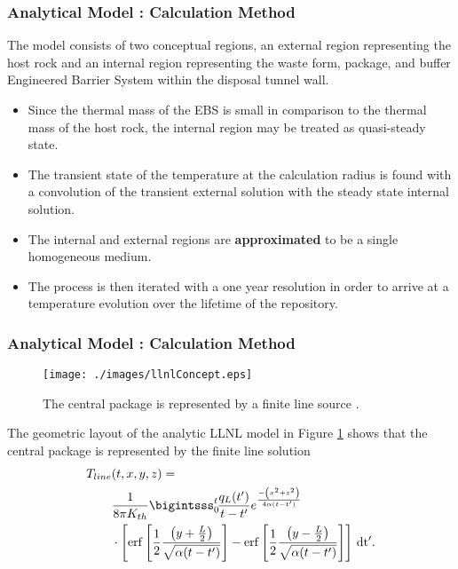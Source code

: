 \begin{frame}[ctb!]
\frametitle{Analytical Model : Calculation Method}
The model consists of two conceptual regions, an external region representing 
the host rock and an internal region representing the waste form, package, and 
buffer Engineered Barrier System within the disposal tunnel wall.   
\begin{itemize}
  \item Since the thermal mass of the EBS is small in comparison to the thermal 
    mass of the host rock, the internal region may be treated as quasi-steady 
    state.
  \item The transient state of the temperature at the calculation radius is 
    found with a convolution of the transient external solution with the steady 
    state internal solution.
  \item The internal and external regions are \textbf{approximated} to be a 
    single homogeneous medium.
  \item The process is then iterated with a one year resolution in order to 
    arrive at a temperature evolution over the lifetime of the repository. 
\end{itemize}
\end{frame}


\begin{frame}[ctb!]
\frametitle{Analytical Model : Calculation Method}
\begin{minipage}{0.3\textwidth}
\begin{figure}[h!]
  \begin{center}
    \texttt{[image: ./images/llnlConcept.eps]}
  \end{center}
  \caption{The central package is represented by a finite line source
  \cite{sutton_investigations_2011}.}
  \label{fig:llnl}
\end{figure}
\end{minipage}
\hspace{0.01mm}
\begin{minipage}{0.6\textwidth}
The geometric layout of the analytic LLNL model in Figure \ref{fig:llnl} 
shows  that the central package is represented by the finite line solution
\footnotesize{
\begin{align}
  T_{line}&(t,x,y,z) = \nonumber\\
  &\frac{1}{8\pi K_{th}} 
  \bigintsss_0^t\!\frac{q_L(t')}{t-t'}e^{ \frac{-\left(x^2 + z^2\right)}{4\alpha 
  (t-t')} }\nonumber\\ &\cdot\left[ \erf{\left[ \frac{1}{2} \frac{\left( y + 
  \frac{L}{2} \right)}{\sqrt{\alpha(t-t')}}  \right]} - \erf{\left[ \frac{1}{2} 
  \frac{\left( y - \frac{L}{2} \right)}{\sqrt{\alpha(t-t')}}  \right]} 
  \right]\,\mathrm{dt'}.
  \label{line}
\end{align}
}
\end{minipage}
\end{frame}

